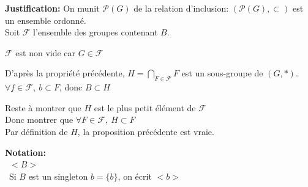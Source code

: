 \documentclass[12pt,twoside,a4paper]{article}
\begin{document}
			\begin{flushleft}
				\textbf{Justification:} On munit $\mathcal{P}(G)$ de la relation d'inclusion: $(\mathcal{P}(G),\subset)$ est un ensemble ordonn\'e.\\
				Soit $\mathcal{F}$ l'ensemble des groupes contenant $B$.
				\begin{liste}
					\item $\mathcal{F}$ est non vide car $G\in\mathcal{F}$
					\item D'apr\`es la propri\'et\'e pr\'ec\'edente, $H=\bigcap\limits_{F\in\mathcal{F}}F$ est un sous-groupe de $(G,*)$.\\
						$\forall f\in\mathcal{F},\ b\subset F$, donc $B\subset H$
					\item Reste \`a montrer que $H$ est le plus petit \'el\'ement de $\mathcal{F}$\\
						Donc montrer que $\forall F\in\mathcal{F},\ H\subset F$\\
						Par d\'efinition de $H$, la proposition pr\'ec\'edente est vraie.
				\end{liste}
			\end{flushleft}
			\begin{flushleft}
				\textbf{Notation:}\\
				\textbullet\ $<B>$\\\textbullet\ Si $B$ est un singleton $b=\{b\}$, on \'ecrit $<b>$
			\end{flushleft}
\newpage
\end{document}
